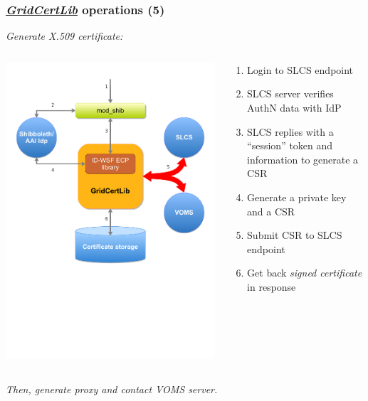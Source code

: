 \documentclass{beamer}
\newcommand{\+}{\vspace{1em}}
\newcommand{\GridCertLib}{\href{http://gridcertlib.googlecode.com/}{{\em GridCertLib}}}
\begin{document}
\begin{frame}
  \frametitle{\GridCertLib{} operations (5)}
  \emph{Generate X.509 certificate:}
  \begin{columns}
    \begin{column}{0.4\textwidth}
      \includegraphics[width=\linewidth,viewport=0 300 600 650]{architecture5}
    \end{column}
    \begin{column}{0.6\textwidth}
      \begin{enumerate}
      \item Login to SLCS endpoint
      \item SLCS server verifies AuthN data with IdP
      \item SLCS replies with a ``session'' token and information
        to generate a CSR
      \item Generate a private key and a CSR
      \item Submit CSR to SLCS endpoint
      \item Get back \emph{signed certificate} in response
      \end{enumerate}
    \end{column}
  \end{columns}

  \emph{Then, generate proxy and contact VOMS server.}
\end{frame}
\end{document}
